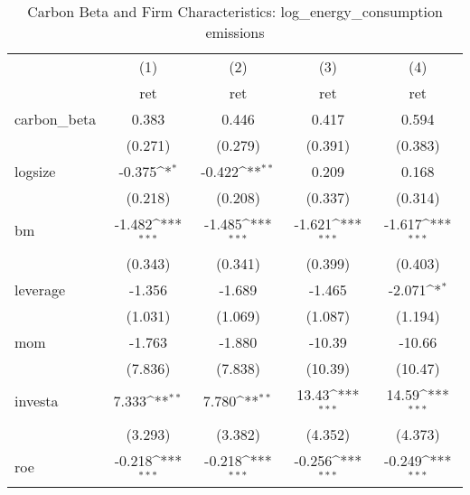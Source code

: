 \begin{table}[htbp]\centering
\def\sym#1{\ifmmode^{#1}\else\(^{#1}\)\fi}
\caption{Carbon Beta and Firm Characteristics: log\_energy\_consumption emissions}
\begin{tabular}{l*{4}{c}}
\hline\hline
                    &\multicolumn{1}{c}{(1)}&\multicolumn{1}{c}{(2)}&\multicolumn{1}{c}{(3)}&\multicolumn{1}{c}{(4)}\\
                    &\multicolumn{1}{c}{ret}&\multicolumn{1}{c}{ret}&\multicolumn{1}{c}{ret}&\multicolumn{1}{c}{ret}\\
\hline
carbon\_beta         &       0.383         &       0.446         &       0.417         &       0.594         \\
                    &     (0.271)         &     (0.279)         &     (0.391)         &     (0.383)         \\
[1em]
logsize             &      -0.375\sym{*}  &      -0.422\sym{**} &       0.209         &       0.168         \\
                    &     (0.218)         &     (0.208)         &     (0.337)         &     (0.314)         \\
[1em]
bm                  &      -1.482\sym{***}&      -1.485\sym{***}&      -1.621\sym{***}&      -1.617\sym{***}\\
                    &     (0.343)         &     (0.341)         &     (0.399)         &     (0.403)         \\
[1em]
leverage            &      -1.356         &      -1.689         &      -1.465         &      -2.071\sym{*}  \\
                    &     (1.031)         &     (1.069)         &     (1.087)         &     (1.194)         \\
[1em]
mom                 &      -1.763         &      -1.880         &      -10.39         &      -10.66         \\
                    &     (7.836)         &     (7.838)         &     (10.39)         &     (10.47)         \\
[1em]
investa             &       7.333\sym{**} &       7.780\sym{**} &       13.43\sym{***}&       14.59\sym{***}\\
                    &     (3.293)         &     (3.382)         &     (4.352)         &     (4.373)         \\
[1em]
roe                 &      -0.218\sym{***}&      -0.218\sym{***}&      -0.256\sym{***}&      -0.249\sym{***}\\

\end{tabular}
\end{table}
